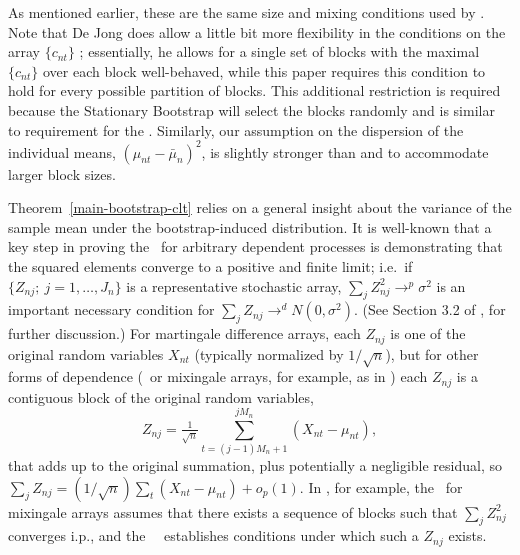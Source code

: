 \documentclass[11pt]{article}
\begin{document}
As mentioned earlier, these are the same size and mixing conditions
used by \citet{Jon:97}.
Note that De Jong does allow a little bit more flexibility in the
conditions on the array $\{c_{nt}\}$ \citep[see also][]{Dav:93};
essentially, he allows for a single set of blocks with the
maximal $\{c_{nt}\}$ over each block well-behaved, while this
paper requires this condition to hold for every possible partition of
blocks.  This additional restriction is required because the
Stationary Bootstrap will select the blocks randomly and is similar to
 requirement for the \fclt. Similarly, our assumption
on the dispersion of the individual means, $(\mu_{nt} - \bar\mu_n)^2$, is
slightly stronger than  and  to
accommodate larger block sizes.

Theorem~\ref{main-bootstrap-clt} relies on a general insight about the
variance of the sample mean under the bootstrap-induced
distribution. It is well-known that a key step in proving the \clt\
for arbitrary dependent processes is demonstrating that the squared
elements converge to a positive and finite limit; i.e.\ if
$\{Z_{nj};~j=1,\dots,J_n\}$ is a representative stochastic array,
$\sum_j Z_{nj}^2 \to^p \sigma^2$ is an important necessary condition
for $\sum_j Z_{nj} \to^d N(0,\sigma^2)$.  (See Section 3.2 of
\citealp{HaH:80}, for further discussion.)  For martingale difference
arrays, each $Z_{nj}$ is one of the original random variables $X_{nt}$
(typically normalized by $1/\sqrt{n}$), but for other forms of
dependence (\ned\ or mixingale arrays, for example, as in
\citealp{Jon:97}) each $Z_{nj}$ is a contiguous block of the original
random variables,
\begin{equation*}
  Z_{nj} = \tfrac{1}{\sqrt{n}} \sum_{t=(j-1) M_n +1}^{j M_n} (X_{nt} - \mu_{nt}),
\end{equation*}
that adds up to the original summation, plus potentially a negligible
residual, so $\sum_j Z_{nj}= (1/\sqrt{n}) \sum_t (X_{nt} - \mu_{nt}) +
o_p(1)$. In \citet{Jon:97}, for example, the \clt\ for mixingale
arrays assumes that there exists a sequence of blocks such that $\sum_j
Z_{nj}^2$ converges i.p., and the \ned\ \clt\ establishes conditions
under which such a $Z_{nj}$ exists.
\end{document}
